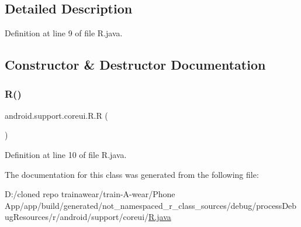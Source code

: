 \subsection{Detailed Description}


Definition at line 9 of file R.\+java.



\subsection{Constructor \& Destructor Documentation}
\mbox{\label{classandroid_1_1support_1_1coreui_1_1_r_a3da75b0c0738bf933a54234a5d209dbd}} 
\subsubsection{\texorpdfstring{R()}{R()}}
{\footnotesize\ttfamily android.\+support.\+coreui.\+R.\+R (\begin{DoxyParamCaption}{ }\end{DoxyParamCaption})\hspace{0.3cm}{\ttfamily [private]}}



Definition at line 10 of file R.\+java.


\begin{DoxyCode}{0}

\end{DoxyCode}


The documentation for this class was generated from the following file\+:\begin{DoxyCompactItemize}
\item 
D\+:/cloned repo trainawear/train-\/\+A-\/wear/\+Phone App/app/build/generated/not\+\_\+namespaced\+\_\+r\+\_\+class\+\_\+sources/debug/process\+Debug\+Resources/r/android/support/coreui/\mbox{\hyperlink{process_debug_resources_2r_2android_2support_2coreui_2_r_8java}{R.\+java}}\end{DoxyCompactItemize}
